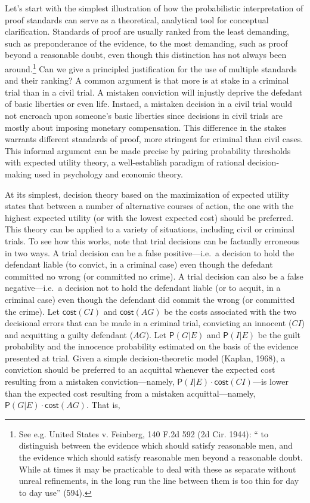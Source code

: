 \documentclass[
  10pt,
  dvipsnames,enabledeprecatedfontcommands]{scrartcl}
\newcommand{\pr}[1]{\mathsf{P}(#1)}
\newcommand{\cost}{\mathsf{cost}}
\begin{document}
Let's start with the simplest illustration of how the probabilistic
interpretation of proof standards can serve as a theoretical, analytical
tool for conceptual clarification. Standards of proof are usually ranked
from the least demanding, such as preponderance of the evidence, to the
most demanding, such as proof beyond a reasonable doubt, even though
this distinction has not always been
around.\footnote{See e.g. United States v. Feinberg, 140 F.2d 592 (2d Cir. 1944): `` to distinguish between the evidence which should satisfy reasonable men, and the evidence which should satisfy reasonable men beyond a reasonable doubt. While at times it may be practicable to deal with these as separate without unreal refinements, in the long run the line between them is too thin for day to day use'' (594).}
Can we give a principled justification for the use of multiple standards
and their ranking? A common argument is that more is at stake in a
criminal trial than in a civil trial. A mistaken conviction will
injustly deprive the defedant of basic liberties or even life. Instaed,
a mistaken decision in a civil trial would not encroach upon someone's
basic liberties since decisions in civil trials are mostly about
imposing monetary compensation. This difference in the stakes warrants
different standards of proof, more stringent for criminal than civil
cases. This informal argument can be made precise by pairing probability
thresholds with expected utility theory, a well-establish paradigm of
rational decision-making used in psychology and economic theory.

At its simplest, decision theory based on the maximization of expected
utility states that between a number of alternative courses of action,
the one with the highest expected utility (or with the lowest expected
cost) should be preferred. This theory can be applied to a variety of
situations, including civil or criminal trials. To see how this works,
note that trial decisions can be factually erroneous in two ways. A
trial decision can be a false positive---i.e.~a decision to hold the
defendant liable (to convict, in a criminal case) even though the
defedant committed no wrong (or committed no crime). A trial decision
can also be a false negative---i.e.~a decision not to hold the defendant
liable (or to acquit, in a criminal case) even though the defendant did
commit the wrong (or committed the crime). Let \(\cost(CI)\) and
\(\cost(AG)\) be the costs associated with the two decisional errors
that can be made in a criminal trial, convicting an innocent (\(CI\))
and acquitting a guilty defendant (\(AG\)). Let \(\pr{G | E}\) and
\(\pr{ I|E}\) be the guilt probability and the innocence probability
estimated on the basis of the evidence presented at trial. Given a
simple decision-theoretic model (Kaplan, 1968), a conviction should be
preferred to an acquittal whenever the expected cost resulting from a
mistaken conviction---namely, \(\pr{I | E } \cdot \cost(CI)\)---is lower
than the expected cost resulting from a mistaken acquittal---namely,
\(\pr{G | E} \cdot \cost(AG)\). That is,
\end{document}
